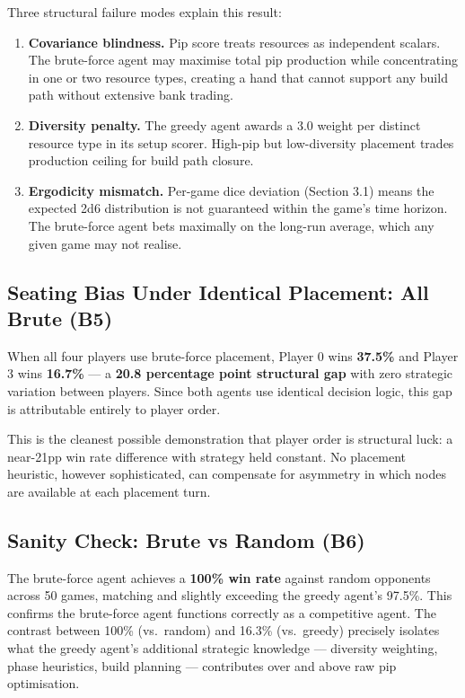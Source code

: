 \documentclass[12pt,a4paper]{article}
\begin{document}
{Three structural failure modes explain this result:

\begin{enumerate}[label=(\roman*)]
  \item \textbf{Covariance blindness.} Pip score treats resources as
  independent scalars. The brute-force agent may maximise total pip
  production while concentrating in one or two resource types, creating
  a hand that cannot support any build path without extensive bank
  trading.

  \item \textbf{Diversity penalty.} The greedy agent awards a $3.0$
  weight per distinct resource type in its setup scorer. High-pip but
  low-diversity placement trades production ceiling for build path
  closure.

  \item \textbf{Ergodicity mismatch.} Per-game dice deviation (Section
  3.1) means the expected 2d6 distribution is not guaranteed within the
  game's time horizon. The brute-force agent bets maximally on the
  long-run average, which any given game may not realise.
\end{enumerate}

\subsection{Seating Bias Under Identical Placement: All Brute (B5)}

When all four players use brute-force placement, Player 0 wins
\textbf{37.5\%} and Player 3 wins \textbf{16.7\%} ---
a \textbf{20.8 percentage point structural gap} with zero strategic
variation between players. Since both agents use identical decision logic,
this gap is attributable entirely to player order.

This is the cleanest possible demonstration that player order is
structural luck: a near-21pp win rate difference with strategy held
constant. No placement heuristic, however sophisticated, can compensate
for asymmetry in which nodes are available at each placement turn.

\subsection{Sanity Check: Brute vs Random (B6)}

The brute-force agent achieves a \textbf{100\% win rate} against random
opponents across 50 games, matching and slightly exceeding the greedy
agent's 97.5\%. This confirms the brute-force agent functions correctly
as a competitive agent. The contrast between 100\% (vs.\ random) and
16.3\% (vs.\ greedy) precisely isolates what the greedy agent's
additional strategic knowledge --- diversity weighting, phase heuristics,
build planning --- contributes over and above raw pip optimisation.

}
\end{document}
